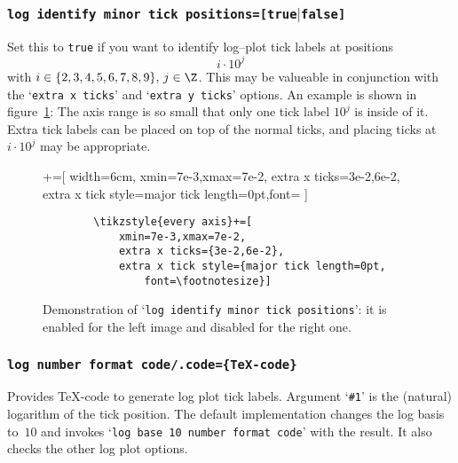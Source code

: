 \subsubsection{\texttt{log identify minor tick positions=[true$|$false]}}
\label{sec:identify:minor:log}%
Set this to \texttt{true} if you want to identify log--plot tick labels at positions 
\[ i \cdot 10^j \]
with $i \in \{2,3,4,5,6,7,8,9\},\, j \in \Z$. This may be valueable in conjunction with the `\texttt{extra x ticks}' and `\texttt{extra y ticks}' options. An example is shown in figure~\ref{fig:identify:minor:log}: The axis range is so small that only one tick label $10^j$ is inside of it. Extra tick labels can be placed on top of the normal ticks, and placing ticks at $i \cdot 10^j $ may be appropriate.
\begin{figure}
	\centering
	+=[%
		width=6cm,
		xmin=7e-3,xmax=7e-2,
		extra x ticks={3e-2,6e-2},
		extra x tick style={major tick length=0pt,font=\footnotesize}
	]%
	\hspace{0.2cm}

	\begin{lstlisting}
		\tikzstyle{every axis}+=[
			xmin=7e-3,xmax=7e-2,
			extra x ticks={3e-2,6e-2},
			extra x tick style={major tick length=0pt,
				font=\footnotesize}]
	\end{lstlisting}
	\caption{Demonstration of `\texttt{log identify minor tick positions}': it is enabled for the left image and disabled for the right one.}
	\label{fig:identify:minor:log}
\end{figure}

\subsubsection{\texttt{log number format code/.code=\{\TeX-code\}}}
Provides \TeX-code to generate log plot tick labels. Argument `\texttt{\#1}' is the (natural) logarithm of the tick position.
The default implementation changes the log basis to~$10$ and invokes `\texttt{log base 10 number format code}' with the result. It also checks the other log plot options.



